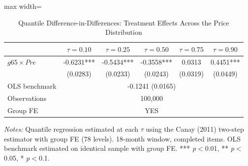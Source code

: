 \begin{table}[htbp]
\centering
\caption{Quantile Difference-in-Differences: Treatment Effects Across the Price Distribution}
\label{tab:quantile_did}
\begin{adjustbox}{max width=\textwidth}
\begin{threeparttable}
\small
\begin{tabular}{lccccc}
\toprule
 & $\tau = 0.10$ & $\tau = 0.25$ & $\tau = 0.50$ & $\tau = 0.75$ & $\tau = 0.90$ \\
\midrule
$g65 \times Pre$ & -0.6231*** & -0.5434*** & -0.3558*** & 0.0313 & 0.4451*** \\
 & (0.0283) & (0.0233) & (0.0243) & (0.0319) & (0.0449) \\
\midrule
OLS benchmark & \multicolumn{5}{c}{-0.1241 (0.0165)} \\
Observations & \multicolumn{5}{c}{100,000} \\
Group FE & \multicolumn{5}{c}{YES} \\
\bottomrule
\end{tabular}
\begin{tablenotes}
\small
\item \textit{Notes:} Quantile regression estimated at each $\tau$ using the Canay (2011)
two-step estimator with group FE (78 levels). 18-month window, completed items.
OLS benchmark estimated on identical sample with group FE.
*** \textit{p}$<$0.01, ** \textit{p}$<$0.05, * \textit{p}$<$0.1.
\end{tablenotes}
\end{threeparttable}
\end{adjustbox}
\end{table}
